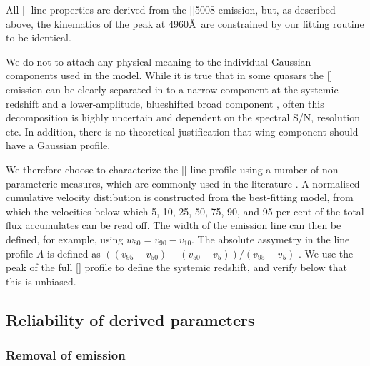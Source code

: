 All [] line properties are derived from the []5008 emission, but, as described above, the kinematics of the peak at 4960\AA\, are constrained by our fitting routine to be identical.

We do not to attach any physical meaning to the individual Gaussian components used in the model. 
While it is true that in some quasars the [] emission can be clearly separated in to a narrow component at the systemic redshift and a lower-amplitude, blueshifted broad component \citep[e.g.][]{shen16a}, often this decomposition is highly uncertain and dependent on the spectral S/N, resolution etc.
In addition, there is no theoretical justification that wing component should have a Gaussian profile.  

We therefore choose to characterize the [] line profile using a number of non-parameteric measures, which are commonly used in the literature \citep[e.g.][]{zakamska14,zakamska16}. 
A normalised cumulative velocity distibution is constructed from the best-fitting model, from which the velocities below which 5, 10, 25, 50, 75, 90, and 95 per cent of the total flux accumulates can be read off. 
The width of the emission line can then be defined, for example, using $w_{80} = v_{90} - v_{10}$. 
The absolute assymetry in the line profile $A$ is defined as $((v_{95} - v_{50}) - (v_{50} - v_{5})) / (v_{95} - v_{5})$ \citep{zakamska14}. 
We use the peak of the full [] profile to define the systemic redshift, and verify below that this is unbiased.  


\subsection{Reliability of derived parameters}

\subsubsection{Removal of  emission}

